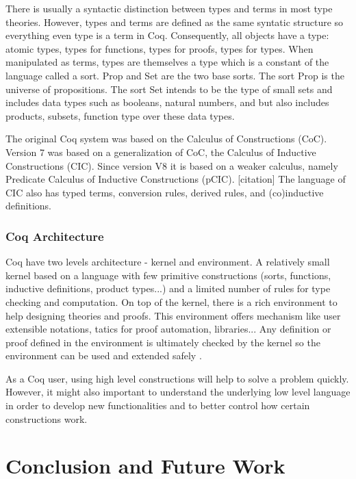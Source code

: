 There is usually a syntactic distinction between types and terms in
most type theories. However, types and terms are defined as the same
syntatic structure so everything even type is a term in
Coq. Consequently, all objects have a type:  atomic types, types for
functions, types for proofs, types for types. When manipulated as
terms, types are themselves a type which is a constant of the language
called a sort. Prop and Set are the two base sorts. The sort Prop is
the universe of propositions. The sort Set intends to be the type of
small sets and includes data types such as booleans, natural numbers,
and but also includes products, subsets, function type over these data
types.

The original Coq system was based on the Calculus of Constructions
(CoC). %
Version 7 was based on a generalization of CoC, the Calculus of Inductive
Constructions (CIC). %
Since version V8 it is based on a weaker calculus, namely Predicate
Calculus of Inductive Constructions (pCIC). %
[citation] 
The language of CIC also has typed terms, conversion rules,
derived rules, and (co)inductive definitions.

\subsection{Coq Architecture}
Coq have two levels architecture - kernel and environment. A relatively small kernel based on a language with few primitive constructions (sorts, functions, inductive definitions, product types...) and a limited number of rules for type checking and computation. On top of the kernel, there is a rich environment to help designing theories and proofs. This environment offers mechanism like user extensible notations, tatics for proof automation, libraries... Any definition or proof defined in the environment is ultimately checked by the kernel so the environment can be used and extended safely \cite{paulin2012introduction}.

As a Coq user, using high level constructions will help to solve a problem quickly. However, it might also important to understand the underlying low level language in order to develop new functionalities and to better control how certain constructions work. 
 






\chapter{Conclusion and Future Work}

